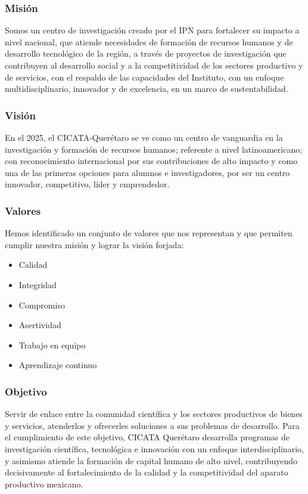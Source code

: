 \documentclass[12pt]{book} %
\begin{document}
		\subsubsection{Misión}
			Somos un centro de investigación creado por el IPN para fortalecer su impacto a nivel nacional, que atiende
			necesidades de formación de recursos humanos y de desarrollo tecnológico de la región, a través de proyectos
			de investigación que contribuyen al desarrollo social y a la competitividad de los sectores productivo y de
			servicios, con el respaldo de las capacidades del Instituto, con un enfoque multidisciplinario, innovador y
			de excelencia, en un marco de sustentabilidad.
		
		\subsubsection{Visión}
			En el 2025, el CICATA-Querétaro se ve como un centro de vanguardia en la investigación y formación de 
			recursos humanos; referente a nivel latinoamericano; con reconocimiento internacional por sus contribuciones
			de alto impacto y como una de las primeras opciones para alumnos e investigadores, por ser un centro
			innovador, competitivo, líder y emprendedor.
		
		\subsubsection{Valores}
			Hemos identificado un conjunto de valores que nos representan y que permiten cumplir nuestra misión y lograr
			la visión forjada:
			\begin{multicols}{2}
				\begin{itemize}
					\item Calidad
					\item Integridad
					\item Compromiso
					\item Asertividad
					\item Trabajo en equipo
					\item Aprendizaje continuo
				\end{itemize}
			\end{multicols}		
			
		\subsubsection{Objetivo}
			Servir de enlace entre la comunidad científica y los sectores productivos de bienes y servicios, atenderlos
			y ofrecerles soluciones a sus problemas de desarrollo. Para el cumplimiento de este objetivo, CICATA
			Querétaro desarrolla programas de investigación científica, tecnológica e innovación con un enfoque
			interdisciplinario, y asimismo atiende la formación de capital humano de alto nivel, contribuyendo
 			decisivamente al fortalecimiento de la calidad y la competitividad del aparato productivo mexicano.
 		
\end{document}
